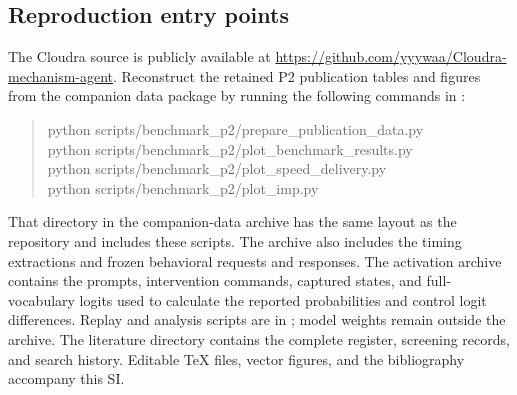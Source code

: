 \subsection{Reproduction entry points}
The Cloudra source is publicly available at \url{https://github.com/yyywaa/Cloudra-mechanism-agent}. Reconstruct the retained P2 publication tables and figures from the companion data package by running the following commands in :
\begin{quote}\small\ttfamily
python scripts/benchmark\_p2/prepare\_publication\_data.py\\
python scripts/benchmark\_p2/plot\_benchmark\_results.py\\
python scripts/benchmark\_p2/plot\_speed\_delivery.py\\
python scripts/benchmark\_p2/plot\_imp.py
\end{quote}
That directory in the companion-data archive has the same layout as the repository and includes these scripts. The archive also includes the timing extractions and frozen behavioral requests and responses. The activation archive contains the prompts, intervention commands, captured states, and full-vocabulary logits used to calculate the reported probabilities and control logit differences. Replay and analysis scripts are in ; model weights remain outside the archive. The literature directory contains the complete register, screening records, and search history. Editable TeX files, vector figures, and the bibliography accompany this SI.

